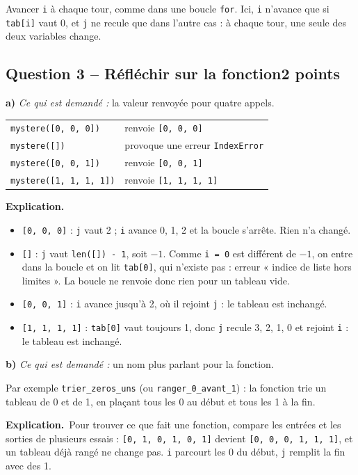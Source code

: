 \documentclass[11pt, a4paper]{exam}
\newcommand{\code}[1]{\texttt{#1}}
\newcommand{\Qt}[2]{\subsection*{#1\hfill{\normalfont\small #2}}}
\newcommand{\rappel}[1]{\noindent\textit{Ce qui est demandé :} #1\par\smallskip}
\newcommand{\explication}{\noindent\textbf{Explication.}\ }
\begin{document}
\begin{erreur}
Avancer \code{i} à chaque tour, comme dans une boucle \code{for}. Ici, \code{i} n'avance que si \code{tab[i]} vaut 0, et \code{j} ne recule que dans l'autre cas : à chaque tour, une seule des deux variables change.
\end{erreur}

\Qt{Question 3 -- Réfléchir sur la fonction}{2 points}

\textbf{a)} \rappel{la valeur renvoyée pour quatre appels.}
\begin{reponse}
\begin{tabular}{@{}ll@{}}
\code{mystere([0, 0, 0])} & renvoie \code{[0, 0, 0]} \\
\code{mystere([])} & provoque une erreur \code{IndexError} \\
\code{mystere([0, 0, 1])} & renvoie \code{[0, 0, 1]} \\
\code{mystere([1, 1, 1, 1])} & renvoie \code{[1, 1, 1, 1]} \\
\end{tabular}
\end{reponse}
\explication
\begin{itemize}
\item \code{[0, 0, 0]} : \code{j} vaut 2 ; \code{i} avance 0, 1, 2 et la boucle s'arrête. Rien n'a changé.
\item \code{[]} : \code{j} vaut \code{len([]) - 1}, soit $-1$. Comme \code{i = 0} est différent de $-1$, on entre dans la boucle et on lit \code{tab[0]}, qui n'existe pas : erreur « indice de liste hors limites ». La boucle ne renvoie donc rien pour un tableau vide.
\item \code{[0, 0, 1]} : \code{i} avance jusqu'à 2, où il rejoint \code{j} : le tableau est inchangé.
\item \code{[1, 1, 1, 1]} : \code{tab[0]} vaut toujours 1, donc \code{j} recule 3, 2, 1, 0 et rejoint \code{i} : le tableau est inchangé.
\end{itemize}

\textbf{b)} \rappel{un nom plus parlant pour la fonction.}
\begin{reponse}
Par exemple \code{trier\_zeros\_uns} (ou \code{ranger\_0\_avant\_1}) : la fonction trie un tableau de 0 et de 1, en plaçant tous les 0 au début et tous les 1 à la fin.
\end{reponse}
\explication Pour trouver ce que fait une fonction, compare les entrées et les sorties de plusieurs essais : \code{[0, 1, 0, 1, 0, 1]} devient \code{[0, 0, 0, 1, 1, 1]}, et un tableau déjà rangé ne change pas. \code{i} parcourt les 0 du début, \code{j} remplit la fin avec des 1.
\end{document}
